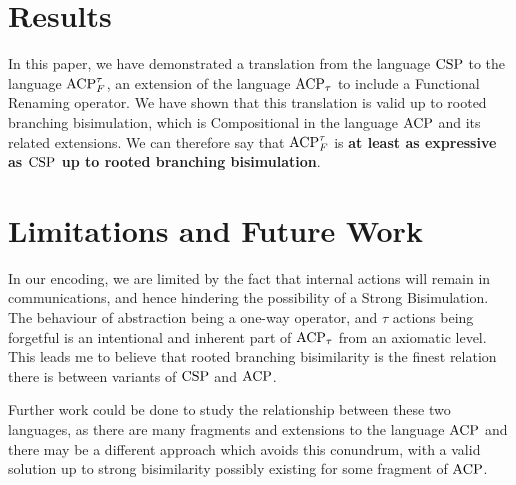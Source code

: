 \documentclass[../hons_project.tex]{subfiles}
\begin{document}
\section{Results}
In this paper, we have demonstrated a translation from the language $\mathrm{CSP}$ to the language $\mathrm{ACP}_{F}^{\tau}$, an extension of the language $\mathrm{ACP}_{\tau}$ to include a Functional Renaming operator. We have shown that this translation is valid up to rooted branching bisimulation, which is Compositional in the language $\mathrm{ACP}$ and its related extensions. We can therefore say that $\mathrm{ACP}_{F}^{\tau}$ is \textbf{at least as expressive as $\mathrm{CSP}$ up to rooted branching bisimulation}.

\section{Limitations and Future Work}
In our encoding, we are limited by the fact that internal actions will remain in communications, and hence hindering the possibility of a Strong Bisimulation. The behaviour of abstraction being a one-way operator, and $\tau$ actions being forgetful is an intentional and inherent part of $\mathrm{ACP}_{\tau}$ from an axiomatic level. This leads me to believe that rooted branching bisimilarity is the finest relation there is between variants of $\mathrm{CSP}$ and $\mathrm{ACP}$.
    
Further work could be done to study the relationship between these two languages, as there are many fragments and extensions to the language $\mathrm{ACP}$ and there may be a different approach which avoids this conundrum, with a valid solution up to strong bisimilarity possibly existing for some fragment of $\mathrm{ACP}$.
\end{document}
